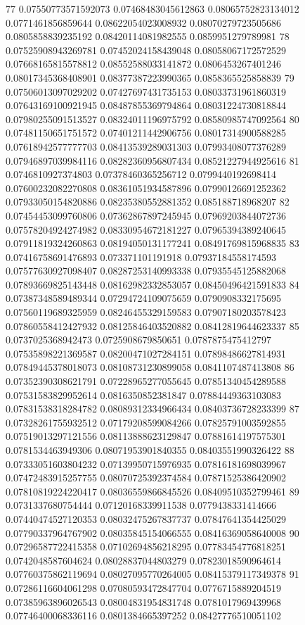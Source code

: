 77 0.07550773571592073 0.07468483045612863 0.08065752823134012 0.0771461856859644 0.08622054023008932 0.08070279723505686 0.0805858839235192 0.08420114081982555 0.0859951279789981
78 0.07525908943269781 0.07452024158439048 0.08058067172572529 0.07668165815578812 0.08552588033141872 0.0806453267401246 0.08017345368408901 0.08377387223990365 0.0858365525858839
79 0.07506013097029202 0.07427697431735153 0.08033731961860319 0.07643169100921945 0.08487855369794864 0.08031224730818844 0.07980255091513527 0.08324011196975792 0.08580985747092564
80 0.07481150651751572 0.07401211442906756 0.08017314900588285 0.07618942577777703 0.08413539289031303 0.07993408077376289 0.07946897039984116 0.08282360956807434 0.08521227944925616
81 0.0746810927374803 0.07378460365256712 0.0799440192698414 0.07600232082270808 0.08361051934587896 0.07990126691252362 0.07933050154820886 0.08235380552881352 0.085188718968207
82 0.07454453099760806 0.07362867897245945 0.07969203844072736 0.07578204924274982 0.08330954672181227 0.07965394389240645 0.07911819324260863 0.08194050131177241 0.08491769815968835
83 0.07416758691476893 0.073371101191918 0.07937184558174593 0.07577630927098407 0.08287253140993338 0.07935545125882068 0.07893669825143448 0.08162982332853057 0.08450496421591833
84 0.07387348589489344 0.07294724109075659 0.0790908332175695 0.07560119689325959 0.08246455329159583 0.07907180203578423 0.07860558412427932 0.08125846403520882 0.08412819644623337
85 0.0737025368942473 0.0725908679850651 0.0787875475412797 0.07535898221369587 0.08200471027284151 0.07898486627814931 0.07849445378018073 0.08108731230899058 0.0841107487413808
86 0.07352390308621791 0.07228965277055645 0.07851340454289588 0.07531583829952614 0.0816350852381847 0.07884449363103083 0.07831538318284782 0.08089312334966434 0.08403736728233399
87 0.07328261755932512 0.07179208599084266 0.07825791003592855 0.07519013297121556 0.08113888623129847 0.07881614197575301 0.0781534463949306 0.08071953901840355 0.08403551990326422
88 0.07333051603804232 0.07139950715976935 0.07816181698039967 0.07472483915257755 0.08070725392374584 0.07871525386420902 0.07810819224220417 0.08036559866845526 0.08409510352799461
89 0.0731337680754444 0.07120168339911538 0.0779438331414666 0.07440474527120353 0.08032475267837737 0.07847641354425029 0.07790337964767902 0.08035845154066555 0.08416369058640008
90 0.07296587722415358 0.07102694856218295 0.07783454776818251 0.0742048587604624 0.08028837044803279 0.07823018590964614 0.07760375862119694 0.08027095770264005 0.08415379117349378
91 0.07286116604061298 0.07080593472847704 0.0776715889204519 0.07385963896026543 0.08004831954831748 0.0781017969439968 0.07746400068336116 0.0801384665397252 0.08427776510051102
